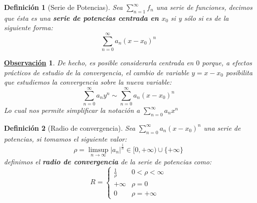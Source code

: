 \documentclass[10pt,a4paper,openright]{book}
\theoremstyle{break}
\newtheorem{defi}{Definición}[chapter]
\newtheorem{obs}{\underline{Observación}}[chapter]
\begin{document}
\begin{defi}[Serie de Potencias]
Sea $\sum_{n=1}^\infty f_n$ una serie de funciones, decimos que ésta es una \textbf{serie de potencias centrada en $x_0$} si y sólo si es de la siguiente forma:
$$\sum_{n=0}^{\infty} a_n (x - x_0)^n$$
\end{defi}

\begin{obs}
De hecho, es posible considerarla centrada en $0$ porque, a efectos prácticos de estudio de la convergencia, el cambio de variable $y = x - x_0$ posibilita que estudiemos la convergencia sobre la nueva variable:
$$\sum_{n = 0}^{\infty} a_n y^n \sim \sum_{n=0}^{\infty} a_n (x - x_0)^n$$
Lo cual nos permite simplificar la notación a $\sum_{n=0}^{\infty} a_n x^n$
\end{obs}

\begin{defi}[Radio de convergencia]
Sea $\sum_{n=0}^{\infty} a_n (x - x_0)^n$ una serie de potencias, si tomamos el siguiente valor:
$$\rho =  \underset{n \to \infty}\limsup |a_n|^{\frac{1}{n}} \in [0, +\infty) \cup \{+ \infty\}$$
definimos el \textbf{radio de convergencia} de la serie de potencias como:
$$R = \begin{cases} \frac{1}{\rho}  & 0 < \rho < \infty \\ +\infty   & \rho = 0 \\ 0   & \rho = +\infty \end{cases}$$
\end{defi}
\end{document}
